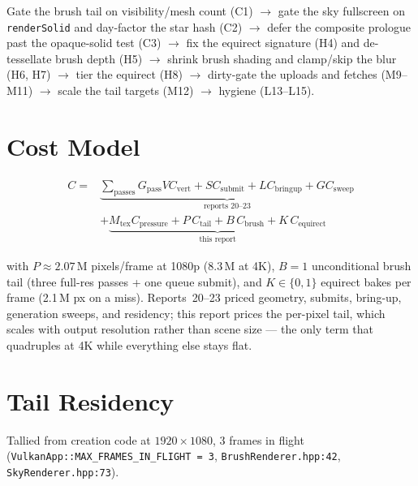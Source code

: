 \documentclass[11pt,a4paper]{article}
\begin{document}
Gate the brush tail on visibility/mesh count (C1) $\rightarrow$ gate the sky
fullscreen on \texttt{renderSolid} and day-factor the star hash (C2)
$\rightarrow$ defer the composite prologue past the opaque-solid test (C3)
$\rightarrow$ fix the equirect signature (H4) and de-tessellate brush depth
(H5) $\rightarrow$ shrink brush shading and clamp/skip the blur (H6, H7)
$\rightarrow$ tier the equirect (H8) $\rightarrow$ dirty-gate the uploads and
fetches (M9--M11) $\rightarrow$ scale the tail targets (M12) $\rightarrow$
hygiene (L13--L15).

\section{Cost Model}

\begin{equation}
\begin{aligned}
C = &\underbrace{\sum_{\mathrm{passes}} G_{\mathrm{pass}} V C_{\mathrm{vert}} + S C_{\mathrm{submit}} + L C_{\mathrm{bringup}} + G C_{\mathrm{sweep}}}_{\text{reports 20--23}} \\
&+ \underbrace{M_{\mathrm{tex}} C_{\mathrm{pressure}} + P\,C_{\mathrm{tail}} + B\,C_{\mathrm{brush}} + K\,C_{\mathrm{equirect}}}_{\text{this report}}
\end{aligned}
\end{equation}

with $P \approx 2.07$\,M pixels/frame at 1080p ($8.3$\,M at 4K),
$B = 1$ unconditional brush tail (three full-res passes + one queue submit),
and $K \in \{0, 1\}$ equirect bakes per frame (2.1\,M px on a miss).
Reports~20--23 priced geometry, submits, bring-up, generation sweeps, and
residency; this report prices the per-pixel tail, which scales with output
resolution rather than scene size --- the only term that quadruples at 4K
while everything else stays flat.

\section{Tail Residency}
\label{sec:vram}

Tallied from creation code at $1920\times1080$, 3 frames in flight
(\texttt{VulkanApp::MAX\_FRAMES\_IN\_FLIGHT = 3},
\texttt{BrushRenderer.hpp:42}, \texttt{SkyRenderer.hpp:73}).
\end{document}

